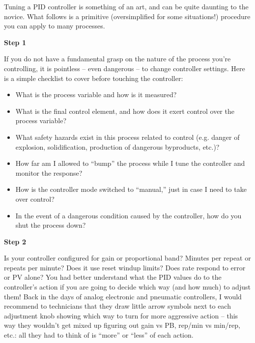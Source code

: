 \vskip 10pt

Tuning a PID controller is something of an art, and can be quite daunting to the novice.  What follows is a primitive (oversimplified for some situations!) procedure you can apply to many processes.

\vskip 10pt

\noindent
{\bf Step 1}

  If you do not have a fundamental grasp on the nature of the process you're controlling, it is pointless -- even dangerous -- to change controller settings.  Here is a simple checklist to cover before touching the controller:

\begin{itemize}
\item{} What is the process variable and how is it measured?
\item{} What is the final control element, and how does it exert control over the process variable?
\item{} What safety hazards exist in this process related to control (e.g. danger of explosion, solidification, production of dangerous byproducts, etc.)?  
\item{} How far am I allowed to ``bump'' the process while I tune the controller and monitor the response?
\item{} How is the controller mode switched to ``manual,'' just in case I need to take over control?
\item{} In the event of a dangerous condition caused by the controller, how do you shut the process down?
\end{itemize}

\vskip 10pt

\noindent
{\bf Step 2}

  Is your controller configured for gain or proportional band?  Minutes per repeat or repeats per minute?  Does it use reset windup limits?  Does rate respond to error or PV alone?  You had better understand what the PID values do to the controller's action if you are going to decide which way (and how much) to adjust them!  Back in the days of analog electronic and pneumatic controllers, I would recommend to technicians that they draw little arrow symbols next to each adjustment knob showing which way to turn for more aggressive action -- this way they wouldn't get mixed up figuring out gain vs PB, rep/min vs min/rep, etc.: all they had to think of is ``more'' or ``less'' of each action.

